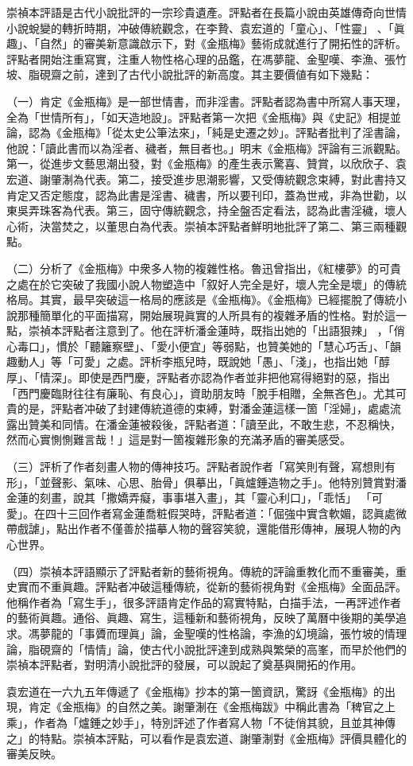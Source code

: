 崇禎本評語是古代小說批評的一宗珍貴遺產。評點者在長篇小說由英雄傳奇向世情小說蛻變的轉折時期，冲破傳統觀念，在李贄、袁宏道的「童心」、「性靈」 、「眞趣」、「自然」的審美新意識啟示下，對《金瓶梅》藝術成就進行了開拓性的評析。評點者開始注重寫實，注重人物性格心理的品鑑，在馮夢龍、金聖嘆、李漁、張竹坡、脂硯齋之前，達到了古代小說批評的新高度。其主要價値有如下幾點：

（一）肯定《金瓶梅》是一部世情書，而非淫書。評點者認為書中所寫人事天理，全為「世情所有」，「如天造地設」。評點者第一次把《金瓶梅》與《史記》相提並論，認為《金瓶梅》「從太史公筆法來」，「純是史遷之妙」。評點者批判了淫書論，他說：「讀此書而以為淫者、穢者，無目者也。」明末《金瓶梅》評論有三派觀點。第一，從進步文藝思潮出發，對《金瓶梅》的產生表示驚喜、贊賞，以欣欣子、袁宏道、謝肇淛為代表。第二，接受進步思潮影響，又受傳統觀念束縛，對此書持又肯定又否定態度，認為此書是淫書、穢書，所以要刊印，蓋為世戒，非為世勸，以東吳弄珠客為代表。第三，固守傳統觀念，持全盤否定看法，認為此書淫穢，壞人心術，決當焚之，以董思白為代表。崇禎本評點者鮮明地批評了第二、第三兩種觀點。

（二）分析了《金瓶梅》中衆多人物的複雜性格。魯迅曾指出，《紅樓夢》的可貴之處在於它突破了我國小說人物塑造中「叙好人完全是好，壞人完全是壞」的傳統格局。其實，最早突破這一格局的應該是《金瓶梅》。《金瓶梅》已經擺脫了傳統小說那種簡單化的平面描寫，開始展現眞實的人所具有的複雜矛盾的性格。對於這一點，崇禎本評點者注意到了。他在評析潘金蓮時，既指出她的「出語狠辣」 ，「俏心毒口」，慣於「聽籬察壁」、「愛小便宜」等弱點，也贊美她的「慧心巧舌」、「韻趣動人」等「可愛」之處。評析李瓶兒時，既說她「愚」、「淺」，也指出她「醇厚」、「情深」。即使是西門慶，評點者亦認為作者並非把他寫得絕對的惡，指出「西門慶臨財往往有廉恥、有良心」，資助朋友時「脫手相贈，全無吝色」。尤其可貴的是，評點者冲破了封建傳統道德的束縛，對潘金蓮這樣一箇「淫婦」，處處流露出贊美和同情。在潘金蓮被殺後，評點者道：「讀至此，不敢生悲，不忍稱快，然而心實惻惻難言哉！」這是對一箇複雜形象的充滿矛盾的審美感受。

（三）評析了作者刻畫人物的傳神技巧。評點者說作者「寫笑則有聲，寫想則有形」，「並聲影、氣味、心思、胎骨」俱摹出，「眞爐錘造物之手」。他特別贊賞對潘金蓮的刻畫，說其「撒嬌弄癡，事事堪入畫」，其「靈心利口」，「乖恬」 「可愛」。在四十三回作者寫金蓮喬粧假哭時，評點者道：「倔強中實含軟媚，認眞處微帶戲謔」，點出作者不僅善於描摹人物的聲容笑貌，還能借形傳神，展現人物的內心世界。

（四）崇禎本評語顯示了評點者新的藝術視角。傳統的評論重教化而不重審美，重史實而不重眞趣。評點者冲破這種傳統，從新的藝術視角對《金瓶梅》全面品評。他稱作者為「寫生手」，很多評語肯定作品的寫實特點，白描手法，一再評述作者的藝術眞趣。通俗、眞趣、寫生，這種新和藝術視角，反映了萬曆中後期的美學追求。馮夢龍的「事贗而理眞」論，金聖嘆的性格論，李漁的幻境論，張竹坡的情理論，脂硯齋的「情情」論，使古代小說批評達到成熟與繁榮的高峯，而早於他們的崇禎本評點者，對明清小說批評的發展，可以說起了奠基與開拓的作用。

袁宏道在一六九五年傳遞了《金瓶梅》抄本的第一箇資訊，驚訝《金瓶梅》的出現，肯定《金瓶梅》的自然之美。謝肇淛在《金瓶梅跋》中稱此書為「稗官之上乘」，作者為「爐錘之妙手」，特別評述了作者寫人物「不徒俏其貌，且並其神傳之」的特點。崇禎本評點，可以看作是袁宏道、謝肇淛對《金瓶梅》評價具體化的審美反映。


